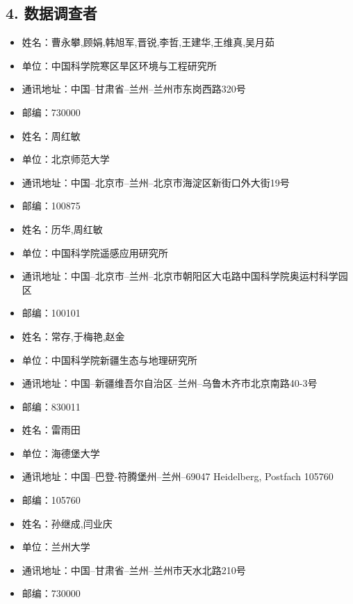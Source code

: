 \documentclass[letterpaper,10pt,english]{sphinxmanual}
\begin{document}
\subsection{4.      数据调查者}
\label{fecd46b0-3390-4580-a415-2d49ba77f9bd:id4}\begin{itemize}
\item {} 
姓名：曹永攀,顾娟,韩旭军,晋锐,李哲,王建华,王维真,吴月茹

\item {} 
单位：中国科学院寒区旱区环境与工程研究所

\item {} 
通讯地址：中国--甘肃省--兰州--兰州市东岗西路320号

\item {} 
邮编：730000

\item {} 
姓名：周红敏

\item {} 
单位：北京师范大学

\item {} 
通讯地址：中国--北京市--兰州--北京市海淀区新街口外大街19号

\item {} 
邮编：100875

\item {} 
姓名：历华,周红敏

\item {} 
单位：中国科学院遥感应用研究所

\item {} 
通讯地址：中国--北京市--兰州--北京市朝阳区大屯路中国科学院奥运村科学园区

\item {} 
邮编：100101

\item {} 
姓名：常存,于梅艳,赵金

\item {} 
单位：中国科学院新疆生态与地理研究所

\item {} 
通讯地址：中国--新疆维吾尔自治区--兰州--乌鲁木齐市北京南路40-3号

\item {} 
邮编：830011

\item {} 
姓名：雷雨田

\item {} 
单位：海德堡大学

\item {} 
通讯地址：中国--巴登-符腾堡州--兰州--69047 Heidelberg, Postfach 105760

\item {} 
邮编：105760

\item {} 
姓名：孙继成,闫业庆

\item {} 
单位：兰州大学

\item {} 
通讯地址：中国--甘肃省--兰州--兰州市天水北路210号

\item {} 
邮编：730000

\end{itemize}
\end{document}
